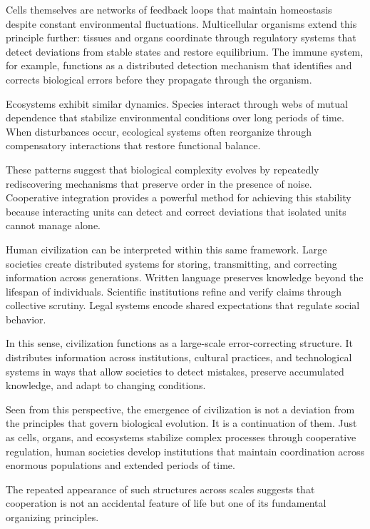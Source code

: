 \documentclass[12pt]{article}
\begin{document}
Cells themselves are networks of feedback loops that maintain homeostasis despite constant environmental fluctuations. Multicellular organisms extend this principle further: tissues and organs coordinate through regulatory systems that detect deviations from stable states and restore equilibrium. The immune system, for example, functions as a distributed detection mechanism that identifies and corrects biological errors before they propagate through the organism.

Ecosystems exhibit similar dynamics. Species interact through webs of mutual dependence that stabilize environmental conditions over long periods of time. When disturbances occur, ecological systems often reorganize through compensatory interactions that restore functional balance.

These patterns suggest that biological complexity evolves by repeatedly rediscovering mechanisms that preserve order in the presence of noise. Cooperative integration provides a powerful method for achieving this stability because interacting units can detect and correct deviations that isolated units cannot manage alone.

Human civilization can be interpreted within this same framework. Large societies create distributed systems for storing, transmitting, and correcting information across generations. Written language preserves knowledge beyond the lifespan of individuals. Scientific institutions refine and verify claims through collective scrutiny. Legal systems encode shared expectations that regulate social behavior.

In this sense, civilization functions as a large-scale error-correcting structure. It distributes information across institutions, cultural practices, and technological systems in ways that allow societies to detect mistakes, preserve accumulated knowledge, and adapt to changing conditions.

Seen from this perspective, the emergence of civilization is not a deviation from the principles that govern biological evolution. It is a continuation of them. Just as cells, organs, and ecosystems stabilize complex processes through cooperative regulation, human societies develop institutions that maintain coordination across enormous populations and extended periods of time.

The repeated appearance of such structures across scales suggests that cooperation is not an accidental feature of life but one of its fundamental organizing principles.
\end{document}

